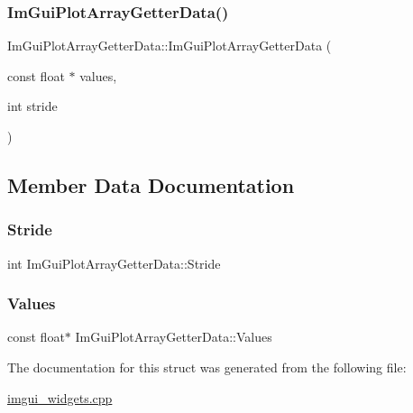 \subsubsection{\texorpdfstring{Im\+Gui\+Plot\+Array\+Getter\+Data()}{ImGuiPlotArrayGetterData()}}
{\footnotesize\ttfamily Im\+Gui\+Plot\+Array\+Getter\+Data\+::\+Im\+Gui\+Plot\+Array\+Getter\+Data (\begin{DoxyParamCaption}\item[{const float $\ast$}]{values,  }\item[{int}]{stride }\end{DoxyParamCaption})\hspace{0.3cm}{\ttfamily [inline]}}



\subsection{Member Data Documentation}
\mbox{\label{struct_im_gui_plot_array_getter_data_aecb2cce4ea91d95ec81937de656cfcd6}} 
\subsubsection{\texorpdfstring{Stride}{Stride}}
{\footnotesize\ttfamily int Im\+Gui\+Plot\+Array\+Getter\+Data\+::\+Stride}

\mbox{\label{struct_im_gui_plot_array_getter_data_aa40ff2e945549744fc622891089ae0fd}} 
\subsubsection{\texorpdfstring{Values}{Values}}
{\footnotesize\ttfamily const float$\ast$ Im\+Gui\+Plot\+Array\+Getter\+Data\+::\+Values}



The documentation for this struct was generated from the following file\+:\begin{DoxyCompactItemize}
\item 
\mbox{\hyperlink{imgui__widgets_8cpp}{imgui\+\_\+widgets.\+cpp}}\end{DoxyCompactItemize}
